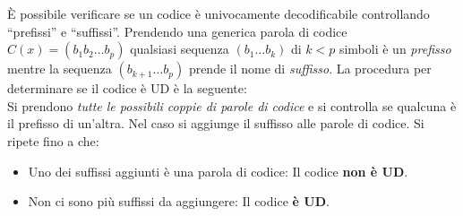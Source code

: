 È possibile verificare se un codice è univocamente decodificabile controllando “prefissi” e “suffissi”. Prendendo una generica parola di codice $C(x) = (b_1 b_2 \dots b_p)$ qualsiasi sequenza $(b_1 \dots b_k)$ di $k < p$ simboli \`e un \textit{prefisso} mentre la sequenza $(b_{k+1}\dots b_p)$ prende il nome di \textit{suffisso}.
La procedura per determinare se il codice \`e UD \`e la seguente: \\
Si prendono \textit{tutte le possibili coppie di parole di codice} e si controlla se qualcuna è il prefisso di un’altra. Nel caso si aggiunge il suffisso alle parole di codice. Si ripete fino a che:
\begin{itemize}
    \item Uno dei suffissi aggiunti è una parola di codice: Il codice \textbf{non \`e UD}.
    \item Non ci sono più suffissi da aggiungere: Il codice \textbf{\`e UD}.
\end{itemize}

